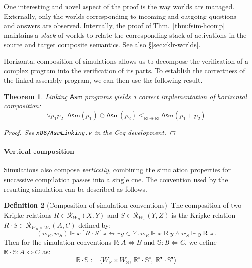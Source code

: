\documentclass[11pt,oneside,draft]{book}
\newtheorem{theorem}{Theorem}[chapter]
\theoremstyle{definition}
\newtheorem{definition}[theorem]{Definition}
\newcommand{\kw}[1]{\ensuremath{ \mathsf{#1} }}
\newcommand{\ifr}[1]{\mathrel{[{#1}]}}
\newcommand{\que}{\circ}         %
\newcommand{\ans}{\bullet}       %
\begin{document}
One interesting and novel aspect of the proof
is the way worlds are managed.
Externally,
only the worlds corresponding to incoming and outgoing
questions and answers are observed.
Internally,
the proof of Thm.~\ref{thm:fsim-hcomp}
maintains a \emph{stack} of
worlds
to relate the corresponding stack of activations
in the source and target composite semantics.
See also \S\ref{sec:cklr-worlds}.

Horizontal composition of simulations
allows us to decompose the verification of a complex program
into the verification of its parts.
To establish the correctness of the linked assembly program,
we can then use the following result.

\begin{theorem} \label{thm:asmlinking} %
Linking \kw{Asm} programs
yields a correct implementation of
horizontal composition:
\[
    \forall p_1 p_2 \,.\,
      \kw{Asm}(p_1) \oplus \kw{Asm}(p_2)
      \le_{\kw{id} \twoheadrightarrow \kw{id}}
      \kw{Asm}(p_1 + p_2)
\]
\begin{proof}
See \texttt{x86/AsmLinking.v} in the Coq development.
\end{proof}
\end{theorem}


\paragraph{Vertical composition} %

Simulations also compose \emph{vertically},
combining the
simulation properties for successive compilation passes
into a single one.
The convention used by the resulting simulation
can be described as follows.

\begin{definition}[Composition of simulation conventions] %
The composition of two Kripke relations
$R \in \mathcal{R}_{W_R}(X, Y)$ and
$S \in \mathcal{R}_{W_S}(Y, Z)$
is the Kripke relation
$R \cdot S \in \mathcal{R}_{W_R \times W_S}(A, C)$
defined by:
\[
  (w_R, w_S) \Vdash x \ifr{R \cdot S} z \Leftrightarrow
  \exists y \in Y \,.\,
    w_R \Vdash x \mathrel{R} y \wedge
    w_S \Vdash y \mathrel{R} z \,.
\]
Then for the simulation conventions
$\mathbb{R} : A \Leftrightarrow B$ and
$\mathbb{S} : B \Leftrightarrow C$,
we define
$\mathbb{R} \cdot \mathbb{S} : A \Leftrightarrow C$ as:
\[
  \mathbb{R} \cdot \mathbb{S} :=
  \langle
    W_\mathbb{R} \times W_\mathbb{S}, \:
    \mathbb{R}^\que \cdot \mathbb{S}^\que, \:
    \mathbb{R}^\ans \cdot \mathbb{S}^\ans
  \rangle
\]
\end{definition}
\end{document}
